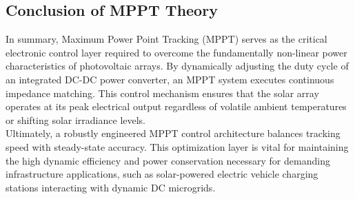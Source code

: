 \subsection{Conclusion of MPPT Theory}
In summary, Maximum Power Point Tracking (MPPT) serves as the critical electronic control layer required to overcome the fundamentally non-linear power characteristics of photovoltaic arrays. By dynamically adjusting the duty cycle of an integrated DC-DC power converter, an MPPT system executes continuous impedance matching. This control mechanism ensures that the solar array operates at its peak electrical output regardless of volatile ambient temperatures or shifting solar irradiance levels.
\\

Ultimately, a robustly engineered MPPT control architecture balances tracking speed with steady-state accuracy. This optimization layer is vital for maintaining the high dynamic efficiency and power conservation necessary for demanding infrastructure applications, such as solar-powered electric vehicle charging stations interacting with dynamic DC microgrids.
